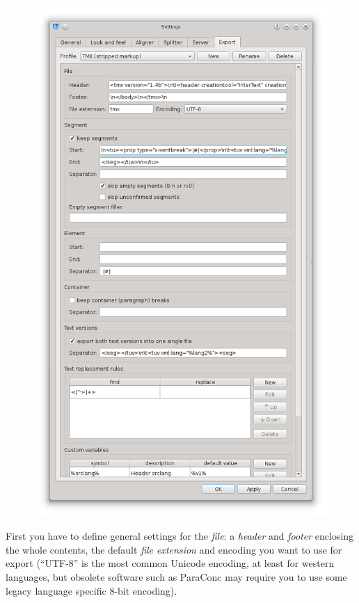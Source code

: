 \documentclass[a4paper,10pt,oneside]{book}
\begin{document}
\begin{figure}[htbf]
 \includegraphics[width=\textwidth]{screenshots/settings_export.png}
\end{figure}

First you have to define general settings for the \emph{file}: a \emph{header} and \emph{footer} enclosing the whole contents, the default \emph{file extension} and encoding you want to use for export (``UTF-8'' is the most common Unicode encoding, at least for western languages, but obsolete software such as ParaConc may require you to use some legacy language specific 8-bit encoding).
\end{document}
